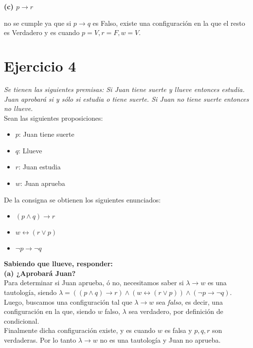 \documentclass[lnbip]{svmultln}
\begin{document}
\textbf{(c) $p \rightarrow r$}

no se cumple ya que si $p \rightarrow q$ es Falso, existe una configuración en la que el resto es Verdadero y es cuando $p = V, r = F, w = V$.

\section{Ejercicio 4}

\textit{Se tienen las siguientes premisas: Si Juan tiene suerte y llueve entonces estudia. Juan aprobará si y sólo si estudia o tiene suerte. Si Juan no tiene suerte entonces no llueve.} \\

Sean las siguientes proposiciones:

\begin{itemize}
  \item $p$: Juan tiene suerte
  \item $q$: Llueve
  \item $r$: Juan estudia
  \item $w$: Juan aprueba
\end{itemize}

De la consigna se obtienen los siguientes enunciados:

\begin{itemize}
  \item $(p \wedge q) \rightarrow r$
  \item $w \leftrightarrow (r \vee p)$
  \item $\neg p \rightarrow \neg q$
\end{itemize}

\textbf{Sabiendo que llueve, responder:} \\

\textbf{(a) ¿Aprobará Juan?} \\ 

Para determinar si Juan aprueba, ó no, necesitamos saber si $\lambda \rightarrow w$ es una tautología, siendo  $\lambda = ((p \wedge q) \rightarrow r) \wedge (w \leftrightarrow (r \vee p)) \wedge (\neg p \rightarrow \neg q)$. \\

Luego, buscamos una configuración tal que $\lambda \rightarrow w$ sea \textit{falso}, es decir, una configuración en la que, siendo $w$ falso, $\lambda$ sea verdadero, por definición de condicional. \\

Finalmente dicha configuración existe, y es cuando $w$ es falsa y $p, q, r$ son verdaderas. Por lo tanto $\lambda \rightarrow w$ no es una tautología y Juan no aprueba. \\
\end{document}
